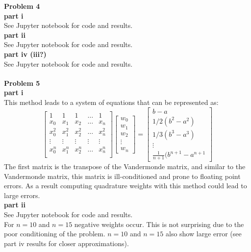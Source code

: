 \documentclass{article} %
\begin{document}
\textbf{Problem 4} \\
\textbf{part i} \\
See Jupyter notebook for code and results.  
\\

\textbf{part ii} \\
See Jupyter notebook for code and results.  
\\

\textbf{part iv (iii?)} \\
See Jupyter notebook for code and results. 
\\
\\

\textbf{Problem 5} \\

\textbf{part i} \\
This method leads to a system of equations that can be represented as:
\begin{equation*}
\begin{bmatrix} 1 & 1 & 1 & \hdots & 1 \\
x_0 & x_1 & x_2 & \hdots & x_n \\
x_0^2 & x_1^2 & x_2^2 & \hdots & x_n^2 \\
\vdots & \vdots & \vdots & \vdots & \vdots \\
x_0^n & x_1^n & x_2^n & \hdots & x_n^n \\
\end{bmatrix} \begin{bmatrix} w_0 \\ w_1 \\ w_2 \\ \vdots \\ w_n \end{bmatrix}
= \begin{bmatrix} b - a \\ 1/2 (b^2 - a^2) \\ 1/3 (b^3  - a^3) \\ \vdots \\ \frac{1}{n+1}(b^{n+1} - a^{n+1} \end{bmatrix}
\end{equation*}
The first matrix is the transpose of the Vandermonde matrix, and similar to the Vandermonde matrix, this matrix is ill-conditioned and prone to floating point errors.  As a result computing quadrature weights with this method could lead to large errors.
\\

\textbf{part ii} \\
See Jupyter notebook for code and results. \\
For $n=10$ and $n=15$ negative weights occur.  This is not surprising due to the poor conditioning of the problem.  $n=10$ and $n=15$ also show large error (see part iv results for closer approximations).
\\
\end{document}
